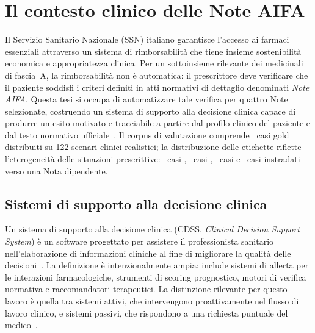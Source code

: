 
\chapter{Il contesto clinico delle Note AIFA}
\label{ch:contesto}

Il Servizio Sanitario Nazionale (SSN) italiano garantisce l'accesso ai farmaci essenziali
attraverso un sistema di rimborsabilità che tiene insieme sostenibilità economica e
appropriatezza clinica.
Per un sottoinsieme rilevante dei medicinali di fascia~A, la rimborsabilità non è
automatica: il prescrittore deve verificare che il paziente soddisfi i criteri
definiti in atti normativi di dettaglio denominati \emph{Note AIFA}.
Questa tesi si occupa di automatizzare tale verifica per quattro Note selezionate,
costruendo un sistema di supporto alla decisione clinica capace di produrre un
esito motivato e tracciabile a partire dal profilo clinico del paziente e dal testo
normativo ufficiale~\cite{aifa2024note}.
Il corpus di valutazione comprende \goldn\ casi gold distribuiti su 122 scenari
clinici realistici; la distribuzione delle etichette riflette l'eterogeneità
delle situazioni prescrittive: \goldRimb\ casi ,
\goldNonRimb\ casi , \goldNonDet\ casi
 e \goldRouted\ casi instradati verso una Nota
dipendente.

\section{Sistemi di supporto alla decisione clinica}
\label{sec:cdss-overview}

Un sistema di supporto alla decisione clinica (CDSS, \emph{Clinical Decision
Support System}) è un software progettato per assistere il professionista sanitario
nell'elaborazione di informazioni cliniche al fine di migliorare la qualità
delle decisioni~\cite{greenes2007cdss}.
La definizione è intenzionalmente ampia: include sistemi di allerta per le
interazioni farmacologiche, strumenti di scoring prognostico, motori di verifica
normativa e raccomandatori terapeutici.
La distinzione rilevante per questo lavoro è quella tra sistemi attivi, che
intervengono proattivamente nel flusso di lavoro clinico, e sistemi passivi, che
rispondono a una richiesta puntuale del medico~\cite{berner2007cdss}.

